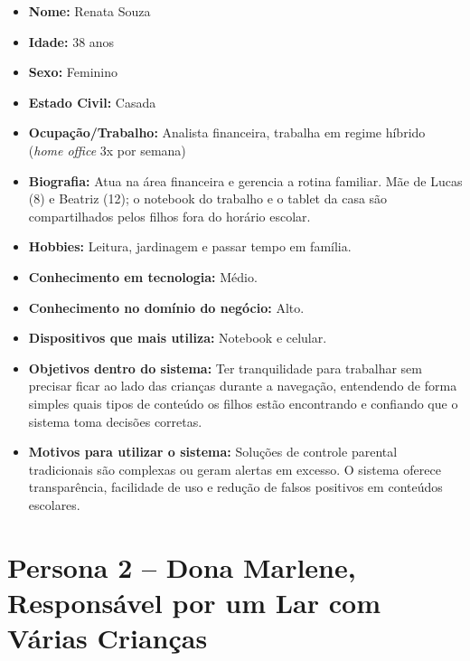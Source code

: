 \documentclass[
    12pt,           %
    oneside,        %
    a4paper,        %
    chapter=TITLE,  %
    english,        %
    brazil          %
]{abntex2}
\begin{document}
\begin{itemize}
    \item \textbf{Nome:} Renata Souza
    \item \textbf{Idade:} 38 anos
    \item \textbf{Sexo:} Feminino
    \item \textbf{Estado Civil:} Casada
    \item \textbf{Ocupação/Trabalho:} Analista financeira, trabalha em regime híbrido (\textit{home office} 3x por semana)
    \item \textbf{Biografia:} Atua na área financeira e gerencia a rotina familiar. Mãe de Lucas (8) e Beatriz (12); o notebook do trabalho e o tablet da casa são compartilhados pelos filhos fora do horário escolar.
    \item \textbf{Hobbies:} Leitura, jardinagem e passar tempo em família.
    \item \textbf{Conhecimento em tecnologia:} Médio.
    \item \textbf{Conhecimento no domínio do negócio:} Alto.
    \item \textbf{Dispositivos que mais utiliza:} Notebook e celular.
    \item \textbf{Objetivos dentro do sistema:} Ter tranquilidade para trabalhar sem precisar ficar ao lado das crianças durante a navegação, entendendo de forma simples quais tipos de conteúdo os filhos estão encontrando e confiando que o sistema toma decisões corretas.
    \item \textbf{Motivos para utilizar o sistema:} Soluções de controle parental tradicionais são complexas ou geram alertas em excesso. O sistema oferece transparência, facilidade de uso e redução de falsos positivos em conteúdos escolares.
\end{itemize}


\section{Persona 2 -- Dona Marlene, Responsável por um Lar com Várias Crianças}
\end{document}

